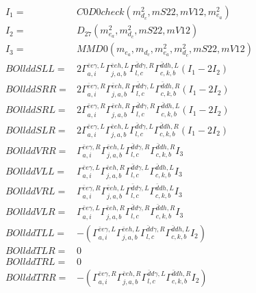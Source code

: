 \documentclass[A4,landscape]{article}
\begin{document}
\begin{align} 
I_1 = & C0D0check(m^2_{d_{{c}}}, mS22, mV12, m^2_{e_{{a}}}) \\ 
I_2 = & D_{27}(m^2_{e_{{a}}}, m^2_{d_{{c}}}, mS22, mV12) \\ 
I_3 = & MMD0(m_{e_{{a}}}, m_{d_{{c}}}, m^2_{e_{{a}}}, m^2_{d_{{c}}}, mS22, mV12) \\ 
  BOllddSLL= & 2  \Gamma^{\bar{e}e \gamma ,L}_{a, i} \Gamma^{\bar{e}e h ,L}_{j, a, b} \Gamma^{\bar{d}d \gamma ,R}_{l, c} \Gamma^{\bar{d}d h ,L}_{c, k, b} (I_1 - 2 I_2) \\ 
  BOllddSRR= & 2  \Gamma^{\bar{e}e \gamma ,R}_{a, i} \Gamma^{\bar{e}e h ,R}_{j, a, b} \Gamma^{\bar{d}d \gamma ,L}_{l, c} \Gamma^{\bar{d}d h ,R}_{c, k, b} (I_1 - 2 I_2) \\ 
  BOllddSRL= & 2  \Gamma^{\bar{e}e \gamma ,R}_{a, i} \Gamma^{\bar{e}e h ,R}_{j, a, b} \Gamma^{\bar{d}d \gamma ,R}_{l, c} \Gamma^{\bar{d}d h ,L}_{c, k, b} (I_1 - 2 I_2) \\ 
  BOllddSLR= & 2  \Gamma^{\bar{e}e \gamma ,L}_{a, i} \Gamma^{\bar{e}e h ,L}_{j, a, b} \Gamma^{\bar{d}d \gamma ,L}_{l, c} \Gamma^{\bar{d}d h ,R}_{c, k, b} (I_1 - 2 I_2) \\ 
  BOllddVRR= &  \Gamma^{\bar{e}e \gamma ,R}_{a, i} \Gamma^{\bar{e}e h ,L}_{j, a, b} \Gamma^{\bar{d}d \gamma ,R}_{l, c} \Gamma^{\bar{d}d h ,R}_{c, k, b} I_3 \\ 
  BOllddVLL= &  \Gamma^{\bar{e}e \gamma ,L}_{a, i} \Gamma^{\bar{e}e h ,R}_{j, a, b} \Gamma^{\bar{d}d \gamma ,L}_{l, c} \Gamma^{\bar{d}d h ,L}_{c, k, b} I_3 \\ 
  BOllddVRL= &  \Gamma^{\bar{e}e \gamma ,R}_{a, i} \Gamma^{\bar{e}e h ,L}_{j, a, b} \Gamma^{\bar{d}d \gamma ,L}_{l, c} \Gamma^{\bar{d}d h ,L}_{c, k, b} I_3 \\ 
  BOllddVLR= &  \Gamma^{\bar{e}e \gamma ,L}_{a, i} \Gamma^{\bar{e}e h ,R}_{j, a, b} \Gamma^{\bar{d}d \gamma ,R}_{l, c} \Gamma^{\bar{d}d h ,R}_{c, k, b} I_3 \\ 
  BOllddTLL= & -( \Gamma^{\bar{e}e \gamma ,L}_{a, i} \Gamma^{\bar{e}e h ,L}_{j, a, b} \Gamma^{\bar{d}d \gamma ,R}_{l, c} \Gamma^{\bar{d}d h ,L}_{c, k, b} I_2) \\ 
  BOllddTLR= & 0 \\ 
  BOllddTRL= & 0 \\ 
  BOllddTRR= & -( \Gamma^{\bar{e}e \gamma ,R}_{a, i} \Gamma^{\bar{e}e h ,R}_{j, a, b} \Gamma^{\bar{d}d \gamma ,L}_{l, c} \Gamma^{\bar{d}d h ,R}_{c, k, b} I_2) \\ 
\end{align} 
\end{document}
